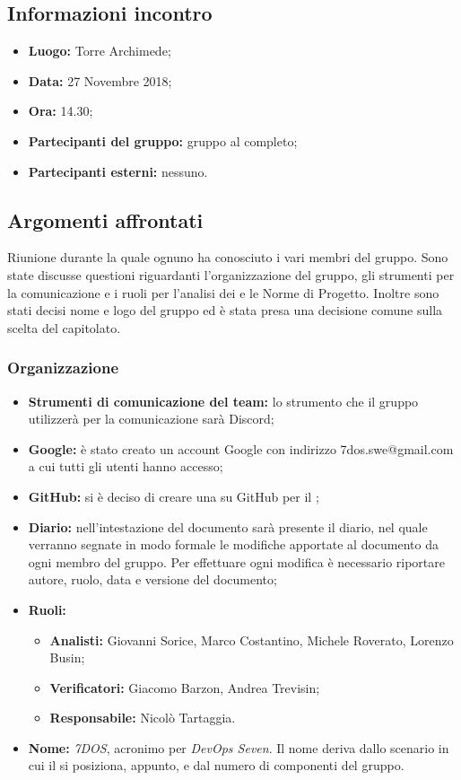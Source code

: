 \subsection{Informazioni incontro}
\begin{itemize}
	\item { \textbf{Luogo:} Torre Archimede};
	\item { \textbf{Data:} 27 Novembre 2018};
	\item { \textbf{Ora:} 14.30};
	\item { \textbf{Partecipanti del gruppo:} gruppo al completo};
	\item { \textbf{Partecipanti esterni:} nessuno}.
\end{itemize}


\subsection{Argomenti affrontati}
Riunione durante la quale ognuno ha conosciuto i vari membri del gruppo. Sono state discusse questioni riguardanti l'organizzazione del gruppo, gli strumenti per la comunicazione e i ruoli per l'analisi dei  e le Norme di Progetto. Inoltre sono stati decisi nome e logo del gruppo ed è stata presa una decisione comune sulla scelta del capitolato.

\subsubsection{Organizzazione}
\begin{itemize}
	\item { \textbf{Strumenti di comunicazione del team:} lo strumento che il gruppo utilizzerà per la comunicazione sarà Discord;}
	\item{ \textbf{Google:} è stato creato un account Google con indirizzo 7dos.swe@gmail.com a cui tutti gli utenti hanno accesso;}
	\item { \textbf{GitHub:} si è deciso di creare una  su GitHub per il ;}
	\item { \textbf{Diario:} nell'intestazione del documento sarà presente il diario, nel quale verranno segnate in modo formale le modifiche apportate al documento da ogni membro del gruppo.
		Per effettuare ogni modifica è necessario riportare autore, ruolo, data e versione del documento;}
	\item { \textbf{Ruoli:}  }
	\begin{itemize}
		\item { \textbf{Analisti:} Giovanni Sorice, Marco Costantino, Michele Roverato, Lorenzo Busin;}
		\item { \textbf{Verificatori:} Giacomo Barzon, Andrea Trevisin;}
		\item { \textbf{Responsabile:} Nicolò Tartaggia.}
	\end{itemize}
	\item { \textbf{Nome:} \emph{7DOS}, acronimo per \emph{DevOps Seven}. Il nome deriva dallo scenario in cui il  si posiziona,  appunto, e dal numero di componenti del gruppo.}
\end{itemize}

